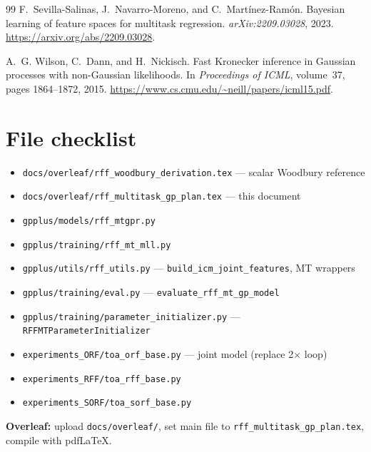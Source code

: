 \documentclass[11pt]{article}
\theoremstyle{plain}
\begin{document}
\begin{thebibliography}{99}
F.~Sevilla-Salinas, J.~Navarro-Moreno, and C.~Mart\'inez-Ram\'on.
\newblock Bayesian learning of feature spaces for multitask regression.
\newblock \emph{arXiv:2209.03028}, 2023.
\newblock \url{https://arxiv.org/abs/2209.03028}.

A.~G. Wilson, C.~Dann, and H.~Nickisch.
\newblock Fast Kronecker inference in Gaussian processes with non-Gaussian likelihoods.
\newblock In \emph{Proceedings of ICML}, volume~37, pages 1864--1872, 2015.
\newblock \url{https://www.cs.cmu.edu/~neill/papers/icml15.pdf}.

\end{thebibliography}

\appendix
\section{File checklist}

\begin{itemize}
  \item[\checkmark] \texttt{docs/overleaf/rff\_woodbury\_derivation.tex} --- scalar Woodbury reference
  \item[\ ] \texttt{docs/overleaf/rff\_multitask\_gp\_plan.tex} --- this document
  \item[\ ] \texttt{gpplus/models/rff\_mtgpr.py}
  \item[\ ] \texttt{gpplus/training/rff\_mt\_mll.py}
  \item[\ ] \texttt{gpplus/utils/rff\_utils.py} --- \texttt{build\_icm\_joint\_features}, MT wrappers
  \item[\ ] \texttt{gpplus/training/eval.py} --- \texttt{evaluate\_rff\_mt\_gp\_model}
  \item[\ ] \texttt{gpplus/training/parameter\_initializer.py} --- \texttt{RFFMTParameterInitializer}
  \item[\ ] \texttt{experiments\_ORF/toa\_orf\_base.py} --- joint model (replace 2$\times$ loop)
  \item[\ ] \texttt{experiments\_RFF/toa\_rff\_base.py}
  \item[\ ] \texttt{experiments\_SORF/toa\_sorf\_base.py}
\end{itemize}

\vspace{1em}
\noindent
\textbf{Overleaf:} upload \texttt{docs/overleaf/}, set main file to \texttt{rff\_multitask\_gp\_plan.tex}, compile with pdfLaTeX.
\end{document}
